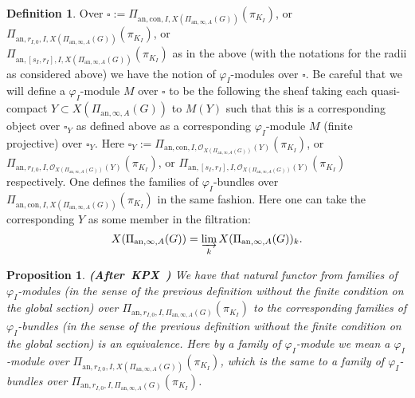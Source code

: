 \documentclass[12pt]{amsart}
\newtheorem{proposition}[theorem]{Proposition}
\theoremstyle{definition}
\newtheorem{definition}[theorem]{Definition}
\numberwithin{equation}{section}
\begin{document}
\begin{definition} 
Over $\square:=\Pi_{\mathrm{an},\mathrm{con},I,X(\Pi_{\mathrm{an},\infty,A}(G))}(\pi_{K_I})$, or $\Pi_{\mathrm{an},r_{I,0},I,X(\Pi_{\mathrm{an},\infty,A}(G))}(\pi_{K_I})$, or\\
 $\Pi_{\mathrm{an},[s_I,r_I],I,X(\Pi_{\mathrm{an},\infty,A}(G))}(\pi_{K_I})$ as in the above (with the notations for the radii as considered above) we have the notion of $\varphi_I$-modules over $\square$. Be careful that we will define a $\varphi_I$-module $M$ over $\square$ to be the following the sheaf taking each quasi-compact $Y\subset X(\Pi_{\mathrm{an},\infty,A}(G))$ to $M(Y)$ such that this is a corresponding object over $\square_Y$ as defined above as a corresponding $\varphi_I$-module $M$ (finite projective) over $\square_Y$. Here $\square_Y:=\Pi_{\mathrm{an},\mathrm{con},I,\mathcal{O}_{X(\Pi_{\mathrm{an},\infty,A}(G))}(Y)}(\pi_{K_I})$, or $\Pi_{\mathrm{an},r_{I,0},I,\mathcal{O}_{X(\Pi_{\mathrm{an},\infty,A}(G))}(Y)}(\pi_{K_I})$, or
 $\Pi_{\mathrm{an},[s_I,r_I],I,\mathcal{O}_{X(\Pi_{\mathrm{an},\infty,A}(G))}(Y)}(\pi_{K_I})$ respectively. One defines the families of $\varphi_I$-bundles over $\Pi_{\mathrm{an},\mathrm{con},I,X(\Pi_{\mathrm{an},\infty,A}(G))}(\pi_{K_I})$ in the same fashion. Here one can take the corresponding $Y$ as some member in the filtration:
\begin{displaymath}
X(\Pi_{\mathrm{an},\infty,A}(G))=\varinjlim_k X(\Pi_{\mathrm{an},\infty,A}(G))_k.	
\end{displaymath}
 
\end{definition}







\begin{proposition} \mbox{\bf{(After KPX \cite[Proposition 2.2.7]{KPX})}} \label{proposition3.5}
We have that natural functor from families of $\varphi_I$-modules (in the sense of the previous definition without the finite condition on the global section) over $\Pi_{\mathrm{an},r_{I,0},I,\Pi_{\mathrm{an},\infty,A}(G)}(\pi_{K_I})$ to the corresponding families of $\varphi_I$-bundles (in the sense of the previous definition without the finite condition on the global section) is an equivalence.	Here by a family of $\varphi_I$-module we mean a $\varphi_I$-module over $\Pi_{\mathrm{an},r_{I,0},I,X(\Pi_{\mathrm{an},\infty,A}(G))}(\pi_{K_I})$, which is the same to a family of $\varphi_I$-bundles over $\Pi_{\mathrm{an},r_{I,0},I,\Pi_{\mathrm{an},\infty,A}(G)}(\pi_{K_I})$.
\end{proposition}
\end{document}
